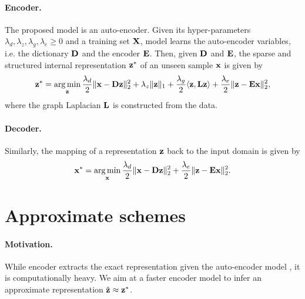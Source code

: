\paragraph{Encoder.}
The proposed model is an auto-encoder. Given its hyper-parameters $\lambda_d, \lambda_z, \lambda_g, \lambda_e \geq 0$ and a training set $\mathbf{X}$, model  learns the auto-encoder variables, i.e. the dictionary $\mathbf{D}$ and the encoder $\mathbf{E}$. Then, given $\mathbf{D}$ and $\mathbf{E}$, the sparse and structured internal representation $\mathbf{z}^*$ of an unseen sample $\mathbf{x}$ is given by
\begin{equation} \label{eqn:z_exact}
	\mathbf{z}^* = \operatorname*{arg\,min}\limits_{\mathbf{z}} \frac{\lambda_d}{2} \| \mathbf{x} - \mathbf{D} \mathbf{z} \|_2^2 + \lambda_z \| \mathbf{z} \|_1 + \frac{\lambda_g}{2} \langle \mathbf{z} , \mathbf{L} \mathbf{z} \rangle + \frac{\lambda_e}{2} \| \mathbf{z} - \mathbf{E} \mathbf{x} \|_2^2,
\end{equation}
where the graph Laplacian $\mathbf{L}$ is constructed from the data.

\paragraph{Decoder.}
Similarly, the mapping of a representation $\mathbf{z}$ back to the input domain is given by
\begin{equation} \label{eqn:x_exact}
	\mathbf{x}^* = \operatorname*{arg\,min}\limits_{\mathbf{x}} \frac{\lambda_d}{2} \| \mathbf{x} - \mathbf{D} \mathbf{z} \|_2^2 + \frac{\lambda_e}{2} \| \mathbf{z} - \mathbf{E} \mathbf{x} \|_2^2.
\end{equation}

\section{Approximate schemes} \label{sec:approximate_schemes}

\paragraph{Motivation.}
While encoder  extracts the exact representation given the auto-encoder model , it is computationally heavy. We aim at a faster encoder model to infer an approximate representation $\tilde{\mathbf{z}} \approx \mathbf{z}^*$.


